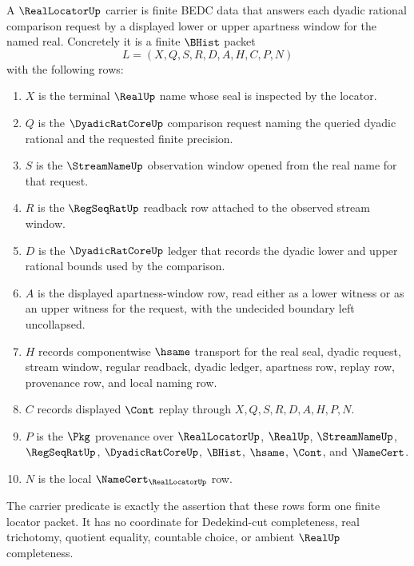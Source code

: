 \begin{definition}
\label{def:real-locator-carrier}
A $\RealLocatorUp$ carrier is finite BEDC data that answers each dyadic rational comparison request by a displayed lower or upper apartness window for the named real. Concretely it is a finite $\BHist$ packet
$$
L=(X,Q,S,R,D,A,H,C,P,N)
$$
with the following rows:
\begin{enumerate}
\item $X$ is the terminal $\RealUp$ name whose seal is inspected by the locator.
\item $Q$ is the $\DyadicRatCoreUp$ comparison request naming the queried dyadic rational and the requested finite precision.
\item $S$ is the $\StreamNameUp$ observation window opened from the real name for that request.
\item $R$ is the $\RegSeqRatUp$ readback row attached to the observed stream window.
\item $D$ is the $\DyadicRatCoreUp$ ledger that records the dyadic lower and upper rational bounds used by the comparison.
\item $A$ is the displayed apartness-window row, read either as a lower witness or as an upper witness for the request, with the undecided boundary left uncollapsed.
\item $H$ records componentwise $\hsame$ transport for the real seal, dyadic request, stream window, regular readback, dyadic ledger, apartness row, replay row, provenance row, and local naming row.
\item $C$ records displayed $\Cont$ replay through $X,Q,S,R,D,A,H,P,N$.
\item $P$ is the $\Pkg$ provenance over $\RealLocatorUp$, $\RealUp$, $\StreamNameUp$, $\RegSeqRatUp$, $\DyadicRatCoreUp$, $\BHist$, $\hsame$, $\Cont$, and $\NameCert$.
\item $N$ is the local $\NameCert_{\RealLocatorUp}$ row.
\end{enumerate}
The carrier predicate is exactly the assertion that these rows form one finite locator packet. It has no coordinate for Dedekind-cut completeness, real trichotomy, quotient equality, countable choice, or ambient $\RealUp$ completeness.
\end{definition}

